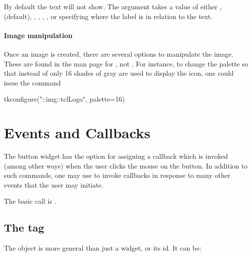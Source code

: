 By default the text will not show. The 
argument takes a value of either , 
(default), , , , ,
or  specifying where the label is in relation to the
text.

\paragraph{Image manipulation}
Once an image is created, there are several options to manipulate the
image. These are found in the \TK\/ man page for , not
. For instance, to change the palette so that instead of
 only 16 shades of gray are used to display the icon,
one could issue the command
\begin{Schunk}
\begin{Sinput}
 tkconfigure("::img::tclLogo", palette=16)
\end{Sinput}
\end{Schunk}




\section{Events and Callbacks}
\label{sec:tcltk:overview:events-callbacks}

The button widget has the  option for assigning a
callback which is invoked (among other ways) when the user clicks the
mouse on the button. In addition to such commands, one may use
 to invoke callbacks in response to many other events
that the user may initiate.

The basic call is . 


\subsection{The tag}

The  object is more general than just a widget, or its
id. It can be:

